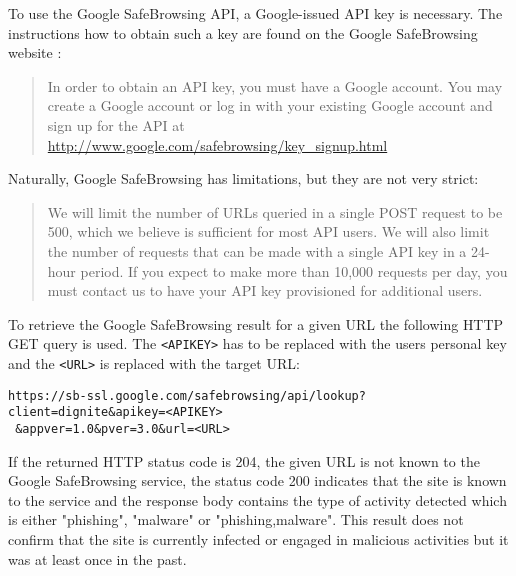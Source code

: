 \documentclass[
	a4paper,					10pt,							twoside,					openright,				notitlepage,			parskip=half,			]{scrreprt}
\begin{document}
To use the Google SafeBrowsing \gls{API}, a Google-issued \gls{API} key is necessary. The instructions how to obtain
such a key are found on the Google SafeBrowsing website \cite{license:google}:
\begin{quotation}
 In order to obtain an \gls{API} key, you must have a Google account. You may create a Google account or log in 
 with your existing Google account and sign up for the \gls{API} at \url{http://www.google.com/safebrowsing/key_signup.html}
\end{quotation}
Naturally, Google SafeBrowsing has limitations, but they are not very strict:

\begin{quotation}
We will limit the number of \gls{URL}s queried in a single POST request to be 500, which we believe is sufficient for most \gls{API} users. 
We will also limit the number of requests that can be made with a single \gls{API} key in a 24-hour period. If you expect to make more 
than 10,000 requests per day, you must contact us to have your \gls{API} key provisioned for additional users.
\end{quotation}

To retrieve the Google SafeBrowsing result for a given \gls{URL} the following \gls{HTTP} GET query is used. The \verb|<APIKEY>| has 
to be replaced with the users personal key and the \verb|<URL>| is replaced with the target \gls{URL}: 
\begin{lstlisting}[language={}]
https://sb-ssl.google.com/safebrowsing/api/lookup?client=dignite&apikey=<APIKEY>
 &appver=1.0&pver=3.0&url=<URL>
\end{lstlisting}
If the returned HTTP status code is 204, the given \gls{URL} is not known to the Google SafeBrowsing service, the status code 200 
indicates that the site is known to the service and the response body contains the type of activity detected which is either 
"phishing", "malware" or "phishing,malware". This result does not confirm that the site is currently infected or engaged in 
malicious activities but it was at least once in the past. 
\end{document}
